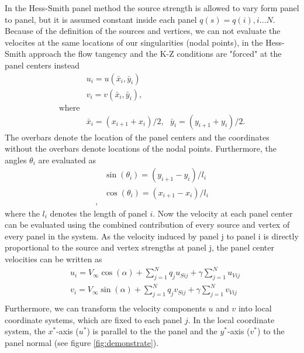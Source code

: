 \documentclass[a4paper,12pt]{article}
\begin{document}
In the Hess-Smith panel method the source strength is allowed to vary form panel to panel, but it is assumed constant inside each panel $q(s) = q(i), i...N$. Because of the definition of the sources and vertices, we can not evaluate the velocites at the same locations of our singularities (nodal points), in the Hess-Smith approach the flow tangency and the K-Z conditions are "forced" at the panel centers instead
\begin{equation}
\begin{split}
&u_i = u(\bar{x}_i, \bar{y}_i) \\
&v_i = v(\bar{x}_i, \bar{y}_i), \\
\text{where}\\
&\bar{x}_i = (x_{i+1} + x_{i})/2,\ \ \   \bar{y}_i = (y_{i+1} + y_{i})/2.
\end{split}
\end{equation}
The overbars denote the location of the panel centers and the coordinates without the overbars denote locations of the nodal points. Furthermore, the angles $\theta_i$ are evaluated as
\begin{equation}
\begin{split}
&\sin(\theta_i) = (y_{i+1} - y_{i})/l_i\\
&\cos(\theta_i) = (x_{i+1} - x_{i})/l_i\\,
\end{split}
\end{equation}
where the  $l_i$ denotes the length of panel $i$. Now the velocity at each panel center can be evaluated using the combined contribution of every source and vertex of every panel in the system. As the velocity induced by panel j to panel i is directly proportional to the source and vertex strengths at panel j, the panel center velocities can be written as
\begin{equation}
\begin{split}
&u_i =V_\infty \cos(\alpha) + \sum_{j=1}^N q_j u_{Sij} + \gamma \sum_{j=1}^Nu_{Vij}\\
&v_i =V_\infty \sin(\alpha) + \sum_{j=1}^N q_j v_{Sij} + \gamma \sum_{j=1}^N v_{Vij}\\
\end{split}
\label{eq:nopeudet_original}
\end{equation}
Furthermore, we can transform the velocity components $u$ and $v$ into local coordinate systems, which are fixed to each panel $j$. In the local coordinate system, the $x^*$-axis ($u^*$) is parallel to the the panel and the $y^*$-axis ($v^*$) to the panel normal (see figure \ref{fig:demonstrate}).
\end{document}

